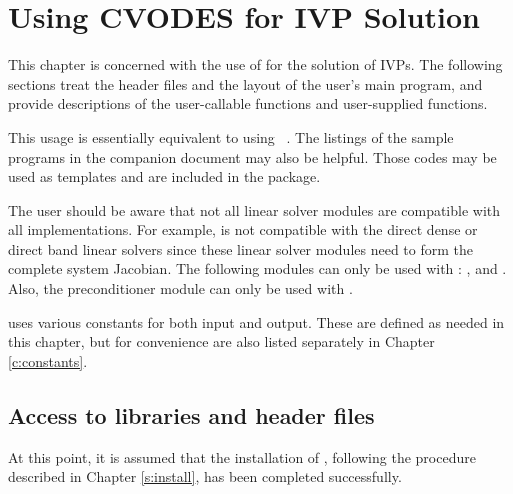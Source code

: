 \chapter{Using CVODES for IVP Solution}\label{s:simulation}

This chapter is concerned with the use of {\cvodes} for the solution
of IVPs.  The following sections treat the header files and the layout of
the user's main program, and provide descriptions of the {\cvodes} user-callable
functions and user-supplied functions. 

This usage is essentially equivalent to using {\cvode}~\cite{cvode2.2.0_ug}.
The listings of the sample programs in the companion document \cite{cvode2.2.0_ex} 
may also be helpful.  Those codes may be used as templates and are included 
in the {\cvodes} package.

The user should be aware that not all linear solver modules are compatible 
with all {\nvector} implementations. 
For example, {\nvecp} is not compatible with the direct dense or direct band 
linear solvers since these linear solver modules need to form the complete
system Jacobian. The following {\cvodes} modules can only be used with {\nvecs}:
{\cvdense}, {\cvband} and {\cvbandpre}. Also, the preconditioner module {\cvbbdpre}
can only be used with {\nvecp}. 

{\cvodes} uses various constants for both input and output.  These are
defined as needed in this chapter, but for convenience are also listed
separately in Chapter \ref{c:constants}.

\section{Access to libraries and header files}\label{ss:file_access}

At this point, it is assumed that the installation of {\cvodes},
following the procedure described in Chapter \ref{s:install}, has
been completed successfully.

